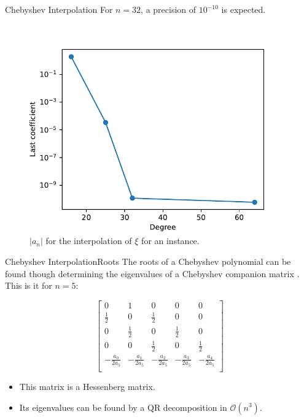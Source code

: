 \documentclass{beamer}
\newcommand{\bigO}{\mathscr{O}}
\begin{document}
\begin{frame}{Chebyshev Interpolation}
	For $n=32$, a precision of $10^{-10}$ is expected.
	
	\begin{figure}
		\centering
		
		\includegraphics[scale=.6]{error_coef}
		\caption{$|a_n|$ for the interpolation of $\xi$ for an instance.}
	\end{figure}
\end{frame}

\begin{frame}{Chebyshev Interpolation}{Roots}
	The roots of a Chebyshev polynomial can be found though determining the eigenvalues of a Chebyshev companion matrix \cite{boyd:2013}. This is it for $n=5$:
	
	\begin{equation*}
	\left[\begin{array}{cccccc}
	0&1&0&0&0\\
	\frac{1}{2} & 0 & \frac{1}{2} & 0 & 0\\
	0 & \frac{1}{2} & 0 & \frac{1}{2} & 0\\
	0 & 0 & \frac{1}{2} & 0 & \frac{1}{2}\\
	-\frac{a_0}{2a_5} & -\frac{a_1}{2a_5} &-\frac{a_2}{2a_5} &-\frac{a_3}{2a_5} &-\frac{a_4}{2a_5}\\
	\end{array}\right]
	\end{equation*}
	
	\begin{itemize}
		\item This matrix is a Hessenberg matrix.
		\item Its eigenvalues can be found by a QR decomposition in $\bigO(n^3)$.
	\end{itemize}
\end{frame}
\end{document}
